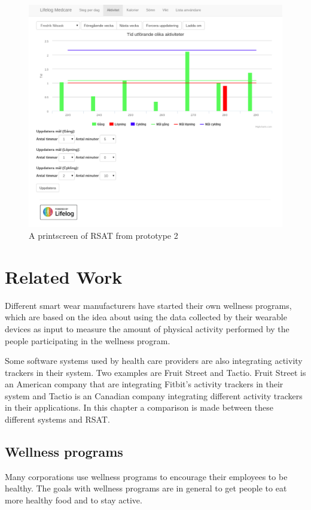 \documentclass{cslthse-msc}
\begin{document}
\begin{figure}[!hbt]
\centering
\includegraphics[scale=0.4]{seceenshot-second-version.pdf} 
\caption{A printscreen of RSAT from prototype 2}\label{fig:second-screen}
\end{figure}

\chapter[Related Work]{Related Work}
\label{ch:relatedwork}


Different smart wear manufacturers have started their own wellness programs, which are based on the idea about using the data collected by their wearable devices as input to measure the amount of physical activity performed by the people participating in the wellness program. 

Some software systems used by health care providers are also integrating activity trackers in their system. Two examples are Fruit Street and Tactio. Fruit Street is an American company that are integrating Fitbit's activity trackers in their system and Tactio is an Canadian company integrating different activity trackers in their applications. In this chapter a comparison is made between these different systems and RSAT.

\section{Wellness programs}
\label{sec:wellness-programs}
Many corporations use wellness programs to encourage their employees to be healthy. The goals with wellness programs are in general to get people to eat more healthy food and to stay active.
\end{document}
